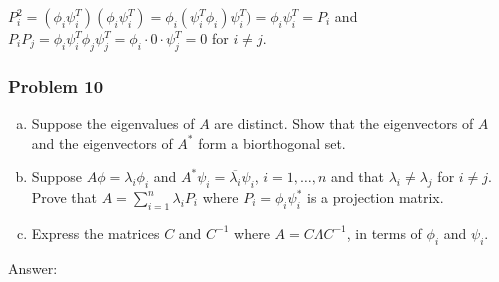 \documentclass{article}
\begin{document}
\begin{enumerate}[a.]
$P_i^2 = (\phi_i\psi_i^T)(\phi_i\psi_i^T) = \phi_i(\psi_i^T\phi_i)\psi_i^T) = \phi_i \psi_i^T = P_i$ and $P_iP_j = \phi_i\psi_i^T\phi_j\psi_j^T = \phi_i \cdot 0 \cdot \psi_j^T = 0$ for $i \neq j$. 

\end{enumerate}


\subsubsection*{Problem 10}

\begin{enumerate}[a.]
\item
Suppose the eigenvalues of $A$ are distinct. Show that the eigenvectors of $A$ and the eigenvectors of $A^*$ form a biorthogonal set. 

\item
Suppose $A\phi = \lambda_i \phi_i$ and $A^* \psi_i = \overline{\lambda_i}\psi_i$, $i = 1,\dots , n$ and that $\lambda_i \neq \lambda_j$ for $i \neq j$. Prove that $A = \sum_{i=1}^n \lambda_i P_i$ where $P_i = \phi_i \psi_i^*$ is a projection matrix. 

\item Express the matrices $C$ and $C^{-1}$ where $A = C \Lambda C^{-1}$, in terms of $\phi_i$ and $\psi_i$. 
\end{enumerate}

Answer: 
\end{document}
